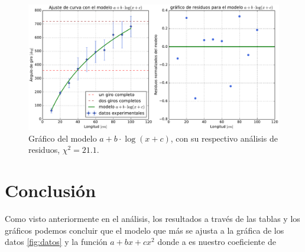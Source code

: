 \documentclass[11pt]{article}
\begin{document}
\begin{figure}[ht]
    \centering
    \includegraphics[scale=0.5]{Informe/img/grafico-modelo-alogb.pdf}
    \caption{Gráfico del modelo $a + b \cdot \log(x + c)$, con su respectivo análisis de residuos, $\chi^2 = 21.1$.}
    \label{fig:alogb}
\end{figure}

\section{Conclusión}
Como visto anteriormente en el análisis, los resultados a través de las tablas y los gráficos podemos concluir que el modelo que más se ajusta a la gráfica de los datos \ref{fig:datos} y la función $a + bx + cx^2$ donde a es nuestro coeficiente de 


\pagebreak



\end{document}
